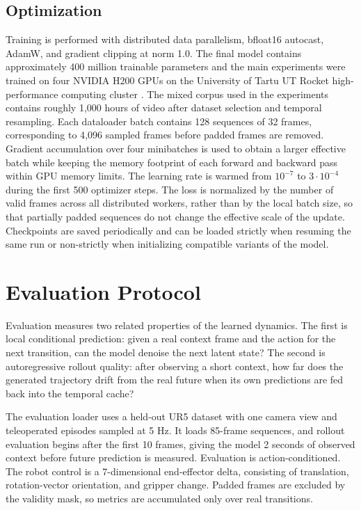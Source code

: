 \documentclass[12pt]{report}
\begin{document}
\subsection{Optimization}
Training is performed with distributed data parallelism, bfloat16 autocast, AdamW, and gradient clipping at norm 1.0. The final model contains approximately 400 million trainable parameters and the main experiments were trained on four NVIDIA H200 GPUs on the University of Tartu UT Rocket high-performance computing cluster \cite{utrocket2018}. The mixed corpus used in the experiments contains roughly 1{,}000 hours of video after dataset selection and temporal resampling. Each dataloader batch contains 128 sequences of 32 frames, corresponding to 4{,}096 sampled frames before padded frames are removed. Gradient accumulation over four minibatches is used to obtain a larger effective batch while keeping the memory footprint of each forward and backward pass within GPU memory limits. The learning rate is warmed from $10^{-7}$ to $3\cdot10^{-4}$ during the first 500 optimizer steps. The loss is normalized by the number of valid frames across all distributed workers, rather than by the local batch size, so that partially padded sequences do not change the effective scale of the update. Checkpoints are saved periodically and can be loaded strictly when resuming the same run or non-strictly when initializing compatible variants of the model.

\section{Evaluation Protocol}
Evaluation measures two related properties of the learned dynamics. The first is local conditional prediction: given a real context frame and the action for the next transition, can the model denoise the next latent state? The second is autoregressive rollout quality: after observing a short context, how far does the generated trajectory drift from the real future when its own predictions are fed back into the temporal cache?

The evaluation loader uses a held-out UR5 dataset with one camera view and teleoperated episodes sampled at 5 Hz. It loads 85-frame sequences, and rollout evaluation begins after the first 10 frames, giving the model 2 seconds of observed context before future prediction is measured. Evaluation is action-conditioned. The robot control is a 7-dimensional end-effector delta, consisting of translation, rotation-vector orientation, and gripper change. Padded frames are excluded by the validity mask, so metrics are accumulated only over real transitions.
\end{document}
